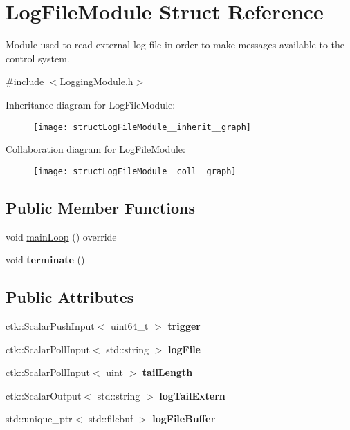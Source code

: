 \hypertarget{structLogFileModule}{}\section{Log\+File\+Module Struct Reference}
\label{structLogFileModule}


Module used to read external log file in order to make messages available to the control system.  




{\ttfamily \#include $<$Logging\+Module.\+h$>$}



Inheritance diagram for Log\+File\+Module\+:
\nopagebreak
\begin{figure}[H]
\begin{center}
\leavevmode
\texttt{[image: structLogFileModule\_\_inherit\_\_graph]}
\end{center}
\end{figure}


Collaboration diagram for Log\+File\+Module\+:
\nopagebreak
\begin{figure}[H]
\begin{center}
\leavevmode
\texttt{[image: structLogFileModule\_\_coll\_\_graph]}
\end{center}
\end{figure}
\subsection*{Public Member Functions}
\begin{DoxyCompactItemize}
\item 
void \hyperlink{structLogFileModule_a730fe9ac0bbe5a6ec9b4df7f9e66c5cd}{main\+Loop} () override
\item 
void {\bfseries terminate} ()\hypertarget{structLogFileModule_ada8647269480d8165b0b0ac1b521b6e5}{}\label{structLogFileModule_ada8647269480d8165b0b0ac1b521b6e5}

\end{DoxyCompactItemize}
\subsection*{Public Attributes}
\begin{DoxyCompactItemize}
\item 
ctk\+::\+Scalar\+Push\+Input$<$ uint64\+\_\+t $>$ {\bfseries trigger}
\item 
ctk\+::\+Scalar\+Poll\+Input$<$ std\+::string $>$ {\bfseries log\+File}
\item 
ctk\+::\+Scalar\+Poll\+Input$<$ uint $>$ {\bfseries tail\+Length}
\item 
ctk\+::\+Scalar\+Output$<$ std\+::string $>$ {\bfseries log\+Tail\+Extern}
\item 
std\+::unique\+\_\+ptr$<$ std\+::filebuf $>$ {\bfseries log\+File\+Buffer}\hypertarget{structLogFileModule_af9308aaa96e504094ac12b4aa7bc8a87}{}\label{structLogFileModule_af9308aaa96e504094ac12b4aa7bc8a87}

\end{DoxyCompactItemize}


